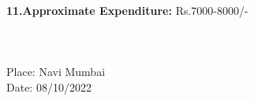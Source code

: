 \documentclass[12pt]{article}
\begin{document}
\begin{tabbing}
		
		\\
		
		
		
		\textbf{11.Approximate Expenditure:}\> \hspace{2cm} Rs.\hspace{0.2cm}7000-8000/-       \\
		
		\\
		\\
		\\
		
		
		
		Place: Navi Mumbai\\
		
		Date:\hspace{0.1cm} 08/10/2022
	\end{tabbing}
	
\end{document}
